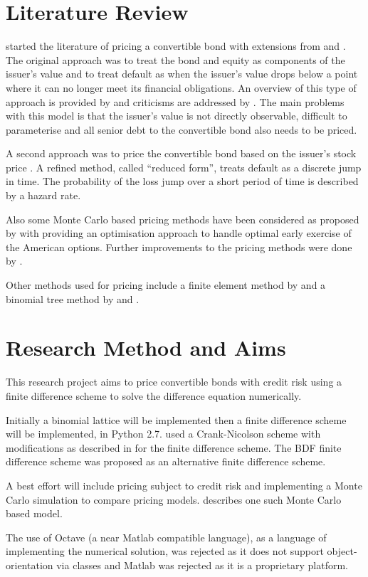 \documentclass[a4paper,11pt,oneside]{article}
\newcommand{\setlinespacing}[1]
           {\renewcommand{\baselinestretch}{#1}\small\normalsize}
\begin{document}
\section{Literature Review}
\citet{I77} started the literature of pricing a convertible bond with extensions from \citet{BS77} and \citet{BS80}.  The original approach was to treat the bond and equity as components of the issuer's value and to treat default as when the issuer's value drops below a point where it can no longer meet its financial obligations.  An overview of this type of approach is provided by \citet{N96} and criticisms are addressed by \citet{JT95}.  The main problems with this model is that the issuer's value is not directly observable, difficult to parameterise and all senior debt to the convertible bond also needs to be priced.

A second approach was to price the convertible bond based on the issuer's stock price \cite{MS86}.  A refined method, called ``reduced form'', treats default as a discrete jump in time.  The probability of the loss jump over a short period of time is described by a hazard rate.

Also some Monte Carlo based pricing methods have been considered as proposed by \citet{B89} with \citet{G03} providing an optimisation approach to handle optimal early exercise of the American options.  Further improvements to the pricing methods were done by \citet{AKW08}.

Other methods used for pricing include a finite element method by \citet{BBH03} and a binomial tree method by \citet{TKN01} and \citet{AFV02}.

\section{Research Method and Aims}
This research project aims to price convertible bonds with credit risk using a finite difference scheme to solve the difference equation numerically.

Initially a binomial lattice will be implemented then a finite difference scheme will be implemented,  in Python 2.7.   used a Crank-Nicolson scheme with modifications as described in \citet{R84} for the finite difference scheme.  The BDF finite difference scheme \cite{B98} was proposed as an alternative finite difference scheme.

A best effort will include pricing subject to credit risk and implementing a Monte Carlo simulation to compare pricing models.  \citet{AKW08} describes one such Monte Carlo based model.

The use of Octave (a near Matlab compatible language), as a language of implementing the numerical solution, was rejected as it does not support object-orientation via classes and Matlab was rejected as it is a proprietary platform.


\clearpage
\setlinespacing{1}


\end{document}
